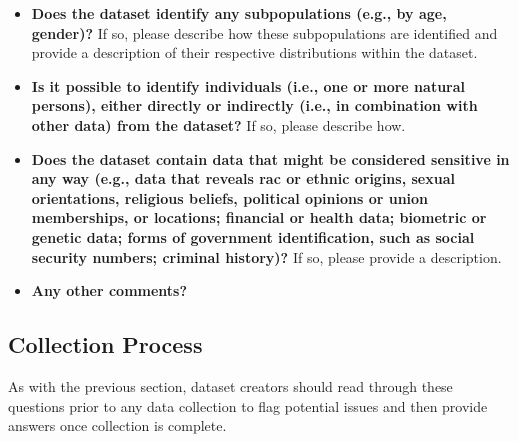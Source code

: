 \begin{itemize}

\item \textbf{Does the dataset identify any subpopulations (e.g., by
    age, gender)?} If so, please describe how these subpopulations are
  identified and provide a description of their respective
  distributions within the dataset.

\item \textbf{Is it possible to identify individuals (i.e., one or
    more natural persons), either directly or indirectly (i.e., in
    combination with other data) from the dataset?} If so, please
    describe how.

\item \textbf{Does the dataset contain data that might be considered
    sensitive in any way (e.g., data that reveals rac or ethnic
    origins, sexual orientations, religious beliefs, political
    opinions or union memberships, or locations; financial or health
    data; biometric or genetic data; forms of government
    identification, such as social security numbers; criminal
    history)?} If so, please provide a description.

\item \textbf{Any other comments?}

\end{itemize}

\subsection{Collection Process}

As with the  previous section, dataset creators should
read through these questions prior to any data collection to flag
potential issues and then provide answers once collection is complete.
\\


